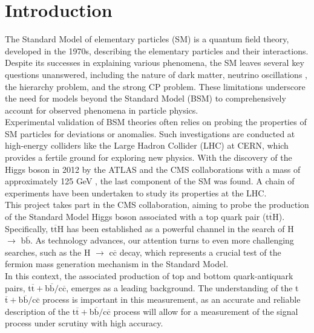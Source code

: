 \cleardoublepage%
\chapter{\label{chap:intro}Introduction}%

\noindent The Standard Model of elementary particles (SM) is a quantum field theory, developed in the 1970s, describing the elementary particles and their interactions. Despite its successes in explaining various phenomena, the SM leaves several key questions unanswered, including the nature of dark matter, neutrino oscillations \cite{Fukuda_1998,Ahmad_2002,Agafonova_2018}, the hierarchy problem, and the strong CP problem. These limitations underscore the need for models beyond the Standard Model (BSM) to comprehensively account for observed phenomena in particle physics.\\
\indent Experimental validation of BSM theories often relies on probing the properties of SM particles for deviations or anomalies. Such investigations are conducted at high-energy colliders like the Large Hadron Collider (LHC) at CERN, which provides a fertile ground for exploring new physics. With the discovery of the Higgs boson in 2012 by the ATLAS and the CMS collaborations with a mass of approximately 125 GeV \cite{Higgs1, Higgs2, Higgs3}, the last component of the SM was found. A chain of experiments have been undertaken to study its properties at the LHC.\\
\indent This project takes part in the CMS collaboration, aiming to probe the production of the Standard Model Higgs boson associated with a top quark pair (t$\overline{\text{t}}$H). Specifically, t$\overline{\text{t}}$H has been established as a powerful channel in the search of H $\rightarrow$ b$\overline{\text{b}}$. As technology advances, our attention turns to even more challenging searches, such as the H $\rightarrow$ c$\overline{\text{c}}$ decay, which represents a crucial test of the fermion mass generation mechanism in the Standard Model.\\
\indent In this context, the associated production of top and bottom quark-antiquark pairs, t$\overline{\text{t}}+$b$\overline{\text{b}}/$c$\overline{\text{c}}$, emerges as a leading background. The understanding of the t$\overline{\text{t}}+$b$\overline{\text{b}}/$c$\overline{\text{c}}$ process is important in this measurement, as an accurate and reliable description of the t$\overline{\text{t}}+$b$\overline{\text{b}}/$c$\overline{\text{c}}$ process will allow for a measurement of the signal process under scrutiny with high accuracy. \\ 
